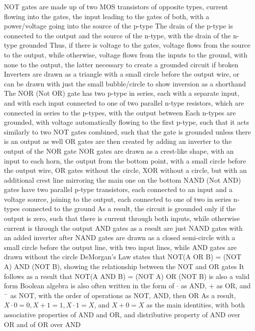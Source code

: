 \documentclass[11 pt, twoside]{article}
\newenvironment{outline*}
{
	\begin{outline}[enumerate]
	}
	{\end{outline}
}
\begin{document}
\begin{outline*}
\2 NOT gates are made up of two MOS transistors of opposite types, current flowing into the gates, the input leading to the gates of both, with a power/voltage going into the source of the p-type
\3 The drain of the p-type is connected to the output and the source of the n-type, with the drain of the n-type grounded
\3 Thus, if there is voltage to the gates, voltage flows from the source to the output, while otherwise, voltage flows from the inputs to the ground, with none to the output, the latter necessary to create a grounded circuit if broken
\3 Inverters are drawn as a triangle with a small circle before the output wire, or can be drawn with just the small bubble/circle to show inversion as a shorthand
\2 The NOR (Not OR) gate has two p-type in series, each with a separate input, and with each input connected to one of two parallel n-type resistors, which are connected in series to the p-types, with the output between
\3 Each n-types are grounded, with voltage automatically flowing to the first p-type, such that it acts similarly to two NOT gates combined, such that the gate is grounded unless there is an output as well
\3 OR gates are then created by adding an inverter to the output of the NOR gate
\3 NOR gates are drawn as a crest-like shape, with an input to each horn, the output from the bottom point, with a small circle before the output wire, OR gates without the circle, XOR without a circle, but with an additional crest line mirroring the main one on the bottom
\2 NAND (Not AND) gates have two parallel p-type transistors, each connected to an input and a voltage source, joining to the output, each connected to one of two in series n-types connected to the ground
\3 As a result, the circuit is grounded only if the output is zero, such that there is current through both inputs, while otherwise current is through the output
\3 AND gates as a result are just NAND gates with an added inverter after
\3 NAND gates are drawn as a closed semi-circle with a small circle before the output line, with two input lines, while AND gates are drawn without the circle
\2 DeMorgan's Law states that NOT(A OR B) = (NOT A) AND (NOT B), showing the relationship between the NOT and OR gates
\3 It follows as a result that NOT(A AND B) = (NOT A) OR (NOT B) is also a valid form 
\2 Boolean algebra is also often written in the form of $\cdot$ as AND, + as OR, and $^-$ as NOT, with the order of operations as NOT, AND, then OR
\3 As a result, $X \cdot 0 = 0, X + 1 = 1, X \cdot 1 = X$, and $X + 0 = X$ as the main identities, with both associative properties of AND and OR, and distributive property of AND over OR and of OR over AND

\end{outline*}
\end{document}
